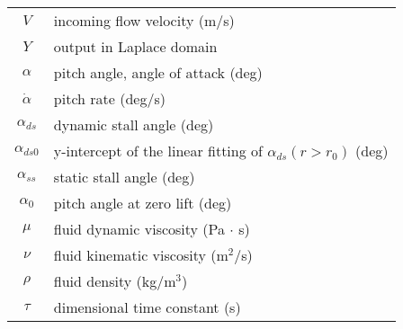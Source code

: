 \begin{tabular}{c|l}
$V$ & incoming flow velocity (m/s) \\
$Y$ & output in Laplace domain \\ 
$\alpha$     &  pitch angle, angle of attack (deg)\\
$\dot{\alpha}$  &  pitch rate (deg/s) \\
$\alpha_{ds}$ & dynamic stall angle (deg) \\
$\alpha_{ds0}$ & y-intercept of the linear fitting of $\alpha_{ds}(r>r_0)$ (deg) \\
$\alpha_ {ss}$ & static stall angle (deg) \\ 
$\alpha_0$ & pitch angle at zero lift (deg) \\
$\mu$ & fluid dynamic viscosity (Pa $\cdot$ s) \\
$\nu$ & fluid kinematic viscosity (m$^2$/s) \\
$\rho$ & fluid density (kg/m$^3$) \\
$\tau$ & dimensional time constant (s) \\
\end{tabular}